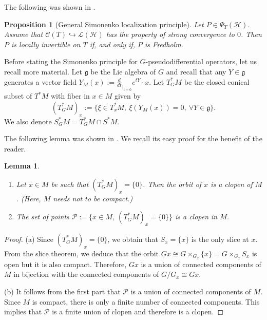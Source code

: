 \documentclass[11pt,a4paper]{amsart}
\newcommand{\maC}{\mathcal C}
\newcommand{\maH}{\mathcal H}
\newcommand{\maL}{\mathcal L}
\newcommand{\maP}{\mathcal P}
\newcommand\<{\langle}
\renewcommand\>{\rangle}
\newtheorem{lemma}[theorem]{Lemma}
\newtheorem{proposition}[theorem]{Proposition}
\theoremstyle{definition}
\begin{document}
The following was shown in  \cite[Section 2]{Baldare.Simonenko}. %

\begin{proposition}[General Simonenko localization principle]\label{prop.gen.Simonenko} 
Let $P \in \Psi_T(\maH)$.
Assume that $\maC(T)\hookrightarrow \maL(\maH)$ has the property of strong convergence to $0$.
Then
$P$ is locally invertible on $T$ if, and only if, $P$ is Fredholm.
\end{proposition}

Before stating the Simonenko principle for $G$-pseudodifferential operators, 
let us recall more material. Let $\mathfrak{g}$ be the Lie algebra of $G$ and 
recall that any $Y \in \mathfrak{g}$ generates a vector field $Y_M(x) := \frac{d}{dt}_{\vert_{t=0}} e^{tY}\cdot x$.
Let $T^*_GM$ be the closed conical subset of $T^*M$ with fiber in $x\in M$ given by %
\begin{equation}\label{Gtransversal}
(T^*_GM)_x:=\{\xi\in T_x^*M,\ \xi(Y_M(x))=0,\ \forall Y \in \mathfrak{g}\}. 
\end{equation}
We also denote $S^*_GM=T^*_GM\cap S^*M$.

The following lemma was shown in \cite{Baldare.Simonenko}. We recall its easy proof for the benefit of the reader.

\begin{lemma}\label{lemma.finite.component}
\begin{enumerate}\renewcommand\labelenumi{\rm (\alph{enumi})}
\item 
Let $x \in M$ be such that $(T^*_GM)_x=\{0\}$. 
Then the orbit of $x$ is a clopen of $M$. (Here, $M$ needs not to be compact.)
\item The set of points $\maP:=\{x \in M, \ (T^*_GM)_x=\{0\}\}$ is a clopen in $M$.
\end{enumerate}
\end{lemma}
%
%
\begin{proof}
(a) Since $(T^*_GM)_x=\{0\}$, we obtain that $S_x=\{x\}$ is the only slice at $x$. From the slice theorem, 
we deduce that the orbit $Gx\cong G\times_{G_x} \{x\}=G \times_{G_x} S_x$ is open but it is also 
compact. Therefore, $Gx$ is a union of connected components of $M$
 in bijection with the connected components of $G/G_x\cong Gx$.
 
(b) It follows from the first part that $\maP$ is a union of connected components of $M$.
Since $M$ is compact, there is only a finite number of connected components.
This implies that $\maP$ is a finite union of clopen and therefore is a clopen. 
\end{proof}
\end{document}
